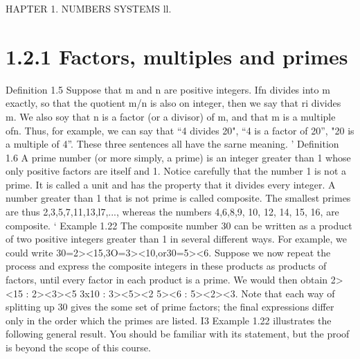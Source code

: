 HAPTER 1. NUMBERS SYSTEMS ll.
\section{1.2.1 Factors, multiples and primes}
Deﬁnition 1.5 Suppose that m and n are positive integers. Ifn divides into m exactly, so that
the quotient m/n is also on integer, then we say that ri divides m. We also soy that n is a factor
(or a divisor) of m, and that m is a multiple ofn.
Thus, for example, we can say that “4 divides 20", “4 is a factor of 20”, "20 is a multiple of 4”.
These three sentences all have the sarne meaning. '
Deﬁnition 1.6 A prime number (or more simply, a prime) is an integer greater than 1 whose
only positive factors are itself and 1.
Notice carefully that the number 1 is not a prime. It is called a unit and has the property that
it divides every integer. A number greater than 1 that is not prime is called composite. The
smallest primes are thus 2,3,5,7,11,13,l7,..., whereas the numbers 4,6,8,9, 10, 12, 14, 15, 16, 
are composite. ‘
Example 1.22 The composite number 30 can be written as a product of two positive integers
greater than 1 in several different ways. For example, we could write
30=2><15,3O=3><10,or30=5><6.
Suppose we now repeat the process and express the composite integers in these products as products
of factors, until every factor in each product is a prime. We would then obtain
2><15 : 2><3><5
3x10 : 3><5><2
5><6 : 5><2><3.
Note that each way of splitting up 30 gives the some set of prime factors; the ﬁnal expressions
differ only in the order which the primes are listed. I3
Example 1.22 illustrates the following general result. You should be familiar with its statement,
but the proof is beyond the scope of this course.
